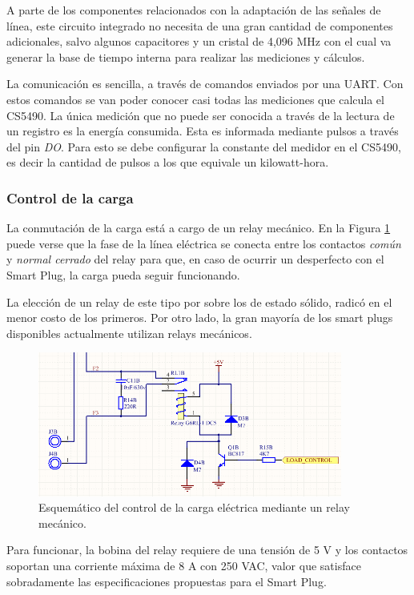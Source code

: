 A parte de los componentes relacionados con la adaptación de las señales de línea, este circuito integrado  no necesita de una gran cantidad de componentes adicionales, salvo algunos capacitores y un cristal de 4,096 MHz con el cual va generar la base de tiempo interna para realizar las mediciones y cálculos.

La comunicación es sencilla, a través de comandos enviados por una UART. Con estos comandos se van poder conocer casi todas las mediciones que calcula el CS5490. La única medición que no puede ser conocida a través de la lectura de un registro es la energía consumida. Esta es informada mediante pulsos a través del pin \textit{DO}. Para esto se debe configurar la constante del medidor en el CS5490, es decir la cantidad de pulsos a los que equivale un kilowatt-hora.


\subsubsection{Control de la carga}

La conmutación de la carga está a cargo de un relay mecánico. En la Figura \ref{fig:pcb_control_carga} puede verse que la fase de la línea eléctrica se conecta entre los contactos \textit{común} y \textit{normal cerrado} del relay para que, en caso de ocurrir un desperfecto con el Smart Plug, la carga pueda seguir funcionando.

La elección de un relay de este tipo por sobre los de estado sólido, radicó en el menor costo de los primeros. Por otro lado, la gran mayoría de los smart plugs disponibles actualmente utilizan relays mecánicos.

\begin{figure}[h]
	\centering
	\includegraphics[width=10cm]{./Figures/3_1_2_pcb_control_carga.png}
	\caption{Esquemático del control de la carga eléctrica mediante un relay mecánico.}
	\label{fig:pcb_control_carga}
\end{figure}

Para funcionar, la bobina del relay requiere de una tensión de 5 V y los contactos soportan una corriente máxima de 8 A con 250 VAC, valor que satisface sobradamente las especificaciones propuestas para el Smart Plug.

